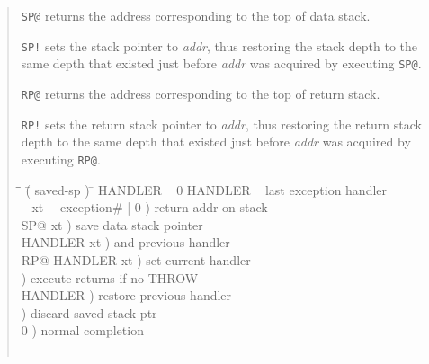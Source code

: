 \begin{quote}
\texttt{SP@} 
	returns the address corresponding to the top of data stack.

\texttt{SP!} 
	sets the stack pointer to \emph{addr}, thus restoring the stack
	depth to the same depth that existed just before \emph{addr} was
	acquired by executing \texttt{SP@}.

\texttt{RP@} 
	returns the address corresponding to the top of return stack.

\texttt{RP!} 
	sets the return stack pointer to \emph{addr}, thus restoring the
	return stack depth to the same depth that existed just before
	\emph{addr} was acquired by executing \texttt{RP@}.

	\ttfamily
	\begin{tabbing}
	\tab \= \tab \= \hspace{7em} \= ( saved-sp ) \= \kill
	 HANDLER ~ 0 HANDLER \word{!} ~  last exception handler \\[\parskip]

	\+ \word{:}  ~  xt -{}- exception\# | 0 )  return addr on stack \\
		SP@ 				\>\>  xt )	\>  save data stack pointer \\
		HANDLER  	\>\>  xt )	\>  and previous handler \\
		RP@ HANDLER \word{!}		\>\>  xt )	\>  set current handler \\
						\>\>  )		\>  execute returns if no THROW \\
		 HANDLER \word{!}	\>\>  )		\>  restore previous handler \\
		 		\>\>  )		\>  discard saved stack ptr \\
								\>\>  0 )	\>  normal completion \\
	\word{;} \\[\parskip]


\end{tabbing}
\end{quote}
